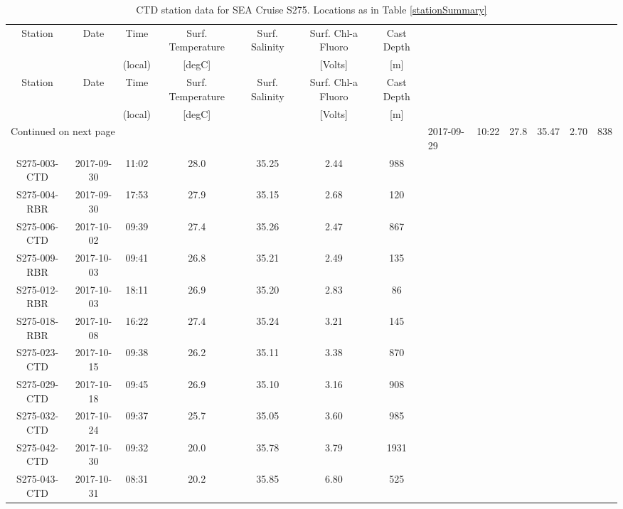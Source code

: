 \begin{longtable}{ccccccc}
\caption{\label{ctdwork} CTD station data for SEA Cruise S275. Locations as in Table \ref{stationSummary}} \\ 
 Station & Date & Time & Surf. Temperature & Surf. Salinity & Surf. Chl-a Fluoro & Cast Depth \\ 
   &  & (local) & [degC] &  & [Volts] & [m] \\ 
\hline\n\endfirsthead
Station & Date & Time & Surf. Temperature & Surf. Salinity & Surf. Chl-a Fluoro & Cast Depth \\ 
 &  & (local) & [degC] &  & [Volts] & [m] \\ 
\hline
\endhead
\hline
\multicolumn{7}{l}{\footnotesize Continued on next page}
\endfoot
\endlastfoot
 \hline
S275-001-CTD & 2017-09-29 & 10:22 & 27.8 & 35.47 & 2.70 & 838 \\ 
  S275-003-CTD & 2017-09-30 & 11:02 & 28.0 & 35.25 & 2.44 & 988 \\ 
  S275-004-RBR & 2017-09-30 & 17:53 & 27.9 & 35.15 & 2.68 & 120 \\ 
  S275-006-CTD & 2017-10-02 & 09:39 & 27.4 & 35.26 & 2.47 & 867 \\ 
  S275-009-RBR & 2017-10-03 & 09:41 & 26.8 & 35.21 & 2.49 & 135 \\ 
  S275-012-RBR & 2017-10-03 & 18:11 & 26.9 & 35.20 & 2.83 & 86 \\ 
  S275-018-RBR & 2017-10-08 & 16:22 & 27.4 & 35.24 & 3.21 & 145 \\ 
  S275-023-CTD & 2017-10-15 & 09:38 & 26.2 & 35.11 & 3.38 & 870 \\ 
  S275-029-CTD & 2017-10-18 & 09:45 & 26.9 & 35.10 & 3.16 & 908 \\ 
  S275-032-CTD & 2017-10-24 & 09:37 & 25.7 & 35.05 & 3.60 & 985 \\ 
  S275-042-CTD & 2017-10-30 & 09:32 & 20.0 & 35.78 & 3.79 & 1931 \\ 
  S275-043-CTD & 2017-10-31 & 08:31 & 20.2 & 35.85 & 6.80 & 525 \\ 
  \hline
\end{longtable}

